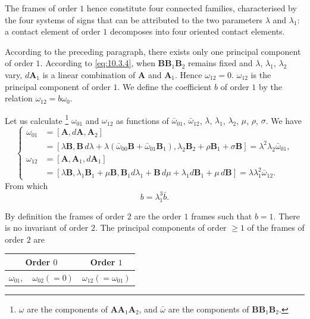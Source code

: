 The frames of order $1$ hence constitute four connected families, characterised by the four systems of signs that can be attributed to the two parameters $\lambda$ and $\lambda_{1}$: a contact element of order $1$ decomposes into four oriented contact elements.

According to the preceding paragraph, there exists only one principal component of order $1$. According to \eqref{eq:10.3.4}, when $\mathbf{BB}_{1}\mathbf{B}_{2}$ remains fixed and $\lambda$, $\lambda_{1}$, $\lambda_{2}$ vary, $d\mathbf{A}_{1}$ is a linear combination of $\mathbf{A}$ and $\mathbf{A}_{1}$. Hence $\omega_{12}=0$. $\omega_{12}$ is the principal component of order $1$. We define the coefficient $b$ of order $1$ by the relation $\omega_{12}=b\omega_{0}$.

Let us calculate \footnote{$\omega$ are the components of $\mathbf{AA}_{1}\mathbf{A}_{2}$, and $\bar\omega$ are the components of $\mathbf{BB}_{1}\mathbf{B}_{2}$.} $\omega_{01}$ and $\omega_{12}$ as functions of $\bar\omega_{01}$, $\bar\omega_{12}$, $\lambda$, $\lambda_{1}$, $\lambda_{2}$, $\mu$, $\rho$, $\sigma$. We have
\begin{equation}
  \label{eq:10.3.5}
  \left\{
    \begin{aligned}      
      \omega_{01}&=[\mathbf{A},d\mathbf{A},\mathbf{A}_{2}]\\
      &=[\lambda\mathbf{B},\mathbf{B}\,d\lambda+\lambda(\bar\omega_{00}\mathbf{B}+\bar\omega_{01}\mathbf{B}_{1}),\lambda_{2}\mathbf{B}_{2}+\rho\mathbf{B}_{1}+\sigma\mathbf{B}]=\lambda^{2}\lambda_{2}\bar\omega_{01},\\
      \omega_{12}&=[\mathbf{A},\mathbf{A}_{1},d\mathbf{A}_{1}]\\
      &=[\lambda\mathbf{B},\lambda_{1}\mathbf{B}_{1}+\mu\mathbf{B},\mathbf{B}_{1}d\lambda_{1}+\mathbf{B}\,d\mu+\lambda_{1}d\mathbf{B}_{1}+\mu\,d\mathbf{B}]=\lambda\lambda^{2}_{1}\bar\omega_{12}.
    \end{aligned}
  \right.
\end{equation}
From which
\begin{equation}
  \label{eq:10.3.6}
  b=\lambda^{3}_{1}\bar b.
\end{equation}

By definition the frames of order $2$ are the order $1$ frames such that $b=1$. There is no invariant of order $2$. The principal components of order $\ge 1$ of the frames of order $2$ are
\begin{center}  
  \begin{tabular}{|c|c|}
    \hline
    Order $0$&Order $1$\\
    \hline
    $\omega_{01},\quad\omega_{02}(=0)$&$\omega_{12}(=\omega_{01})$\\
    \hline
  \end{tabular}
\end{center}

